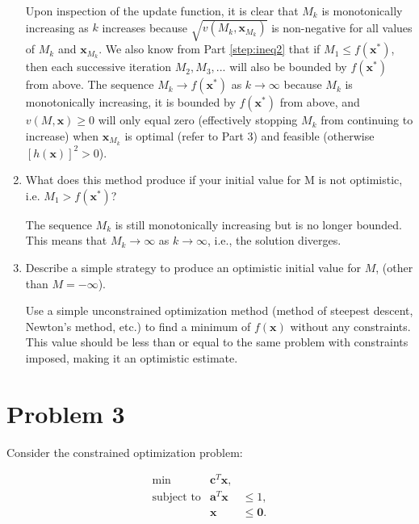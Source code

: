 \documentclass{article}
\begin{document}
\begin{enumerate}
	Upon inspection of the update function, it is clear that $M_k$ is monotonically increasing as $k$ increases because $\sqrt{v(M_k,\mathbf{x}_{M_k})}$ is non-negative for all values of $M_k$ and $\mathbf{x}_{M_k}$.
	We also know from Part \ref{step:ineq2} that if $M_1 \le f(\mathbf{x}^*)$, then each successive iteration $M_2, M_3, ...$ will also be bounded by $f(\mathbf{x}^*)$ from above.
	The sequence $M_k \rightarrow f(\mathbf{x}^*)$ as $k \rightarrow \infty$ because $M_k$ is monotonically increasing, it is bounded by $f(\mathbf{x}^*)$ from above, and $v(M,\mathbf{x}) \ge 0$ will only equal zero (effectively stopping $M_k$ from continuing to increase) when $\mathbf{x}_{M_k}$ is optimal (refer to Part 3) and feasible (otherwise $[h(\mathbf{x})]^2 > 0$).
	
	\item What does this method produce if your initial value for M is not optimistic, i.e. $M_1 > f(\mathbf{x}^*)$?
	
	The sequence $M_k$ is still monotonically increasing but is no longer bounded.
	This means that $M_k \rightarrow \infty$ as $k \rightarrow \infty$, i.e., the solution diverges.
	
	\item Describe a simple strategy to produce an optimistic initial value for $M$, (other than $M = -\infty$).
	
	Use a simple unconstrained optimization method (method of steepest descent, Newton's method, etc.) to find a minimum of $f(\mathbf{x})$ without any constraints.
	This value should be less than or equal to the same problem with constraints imposed, making it an optimistic estimate.
	
\end{enumerate}

\newpage

\section{Problem 3}

Consider the constrained optimization problem:

\begin{eqnarray*}
	\min & \mathbf{c}^T \mathbf{x}, \\
	\text{subject to} & \mathbf{a}^T \mathbf{x} &\le 1, \\
	& \mathbf{x} &\le \mathbf{0}.
\end{eqnarray*}
\end{document}
